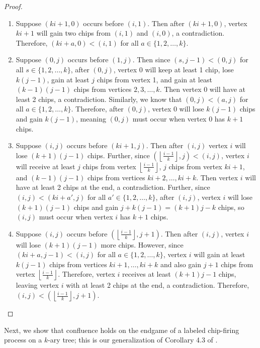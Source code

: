 \documentclass[11pt]{article}
\theoremstyle{remark}
\theoremstyle{definition}
\begin{document}
\begin{proof}
\begin{enumerate}
    \item Suppose $(ki+1,0)$ occurs before $(i,1)$. Then after $(ki+1, 0)$, vertex $ki+1$ will gain two chips from $(i,1)$ and $(i,0)$, a contradiction. Therefore, $(ki+a, 0) < (i, 1)$ for all $a \in \{1, 2, \dots, k\}$.

    \item Suppose $(0,j)$ occurs before $(1,j)$. Then since $(s,j-1)< (0,j)$ for all $s \in \{1,2, \dots, k\}$, after $(0,j)$, vertex 0 will keep at least 1 chip, lose $k(j-1)$, gain at least $j$ chips from vertex 1, and gain at least $(k-1)(j-1)$ chips from vertices $2, 3, \ldots, k$. Then vertex 0 will have at least 2 chips, a contradiction. Similarly, we know that $(0,j) < (a,j)$ for all $a \in \{1, 2, \dots, k\}$. Therefore, after $(0,j)$, vertex 0 will lose $k(j-1)$ chips and gain $k(j-1)$, meaning $(0,j)$ must occur when vertex 0 has $k+1$ chips.

    \item Suppose $(i,j)$ occurs before $(ki+1, j)$. Then after $(i,j)$ vertex $i$ will lose $(k+1)(j-1)$ chips. Further, since $\left ( \left \lfloor \frac {i-1} k \right \rfloor, j \right ) < (i,j)$, vertex $i$ will receive at least $j$ chips from vertex $\left \lfloor \frac {i-1} k \right \rfloor$, $j$ chips from vertex $ki+1$, and $(k-1)(j-1)$ chips from vertices $ki+2, \ldots, ki+k$. Then vertex $i$ will have at least 2 chips at the end, a contradiction. Further, since $(i,j) < (ki+a', j)$ for all $a' \in \{1,2, \dots, k\}$, after $(i,j)$, vertex $i$ will lose $(k+1)(j-1)$ chips and gain $j+k(j-1) = (k+1)j-k$ chips, so $(i,j)$ must occur when vertex $i$ has $k+1$ chips.

    \item Suppose $(i,j)$ occurs before $\left(\left \lfloor \frac {i-1} k \right \rfloor, j+1 \right)$. Then after $(i,j)$, vertex $i$ will lose $(k+1)(j-1)$ more chips. However, since $(ki+a, j-1) < (i,j)$ for all $a \in \{1, 2, \dots, k\}$, vertex $i$ will gain at least $k(j-1)$ chips from vertices $ki+1, \ldots, ki+k$ and also gain $j+1$ chips from vertex $\left \lfloor \frac {i-1} k \right \rfloor$. Therefore, vertex $i$ receives at least $(k+1)j-1$ chips, leaving vertex $i$ with at least 2 chips at the end, a contradiction. Therefore, $(i,j) < \left(\left \lfloor \frac {i-1} k \right \rfloor, j+1 \right).$
\end{enumerate}
\end{proof}

Next, we show that confluence holds on the endgame of a labeled chip-firing process on a $k$-ary tree; this is our generalization of Corollary 4.3 of \cite{MR4827886}.
\end{document}

